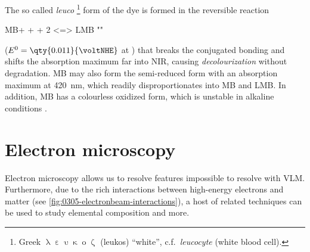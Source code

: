 \documentclass[webedition,openright,titles,swedish,english]{LuaUUThesis}\usepackage[]{graphicx}\usepackage[]{xcolor}
\newcommand{\cf}{c.f.}
\begin{document}
The so called \emph{leuco}%
\footnote{%
   Greek $\uplambda\upepsilon\upupsilon\upkappa\upomicron\upzeta$ (leukos) \enquote{white},
   \cf\ \emph{leucocyte} (white blood cell).}
form of the dye is formed in the reversible reaction
\begin{reaction}
MB+ + \proton{} + 2 \electron{} <=> LMB
 "\label{rxn:leuco-methylene-blue}"
\end{reaction}
($E^0=\qty{0.011}{\voltNHE}$ at )
that breaks the conjugated bonding and shifts the absorption maximum far into
\gls{NIR}, causing \emph{decolourization} without degradation.
\Gls{MB} may also form the semi-reduced form  with an absorption maximum
at \qty{420}{\nm}, which readily disproportionates into MB and LMB. In addition,
\gls{MB} has a colourless oxidized form,  which is unstable in alkaline
conditions \cite{Mills1999}.





\section{Electron microscopy}%
\label{methods:electron-microscopy}

Electron microscopy allows us to resolve features
impossible to resolve with \gls{VLM}.
Furthermore, due to the rich interactions between high-energy electrons
and matter (see \cref{fig:0305-electronbeam-interactions}), a host of related
techniques can be used to study elemental composition and more.

%
\end{document}
